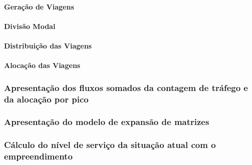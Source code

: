 \documentclass[]{article}
\let\oldparagraph\paragraph
\renewcommand{\paragraph}[1]{\oldparagraph{#1}\mbox{}}
\begin{document}
\hypertarget{gerauxe7uxe3o-de-viagens}{%
\paragraph{Geração de Viagens}\label{gerauxe7uxe3o-de-viagens}}

\hypertarget{divisuxe3o-modal}{%
\paragraph{Divisão Modal}\label{divisuxe3o-modal}}

\hypertarget{distribuiuxe7uxe3o-das-viagens}{%
\paragraph{Distribuição das
Viagens}\label{distribuiuxe7uxe3o-das-viagens}}

\hypertarget{alocauxe7uxe3o-das-viagens}{%
\paragraph{Alocação das Viagens}\label{alocauxe7uxe3o-das-viagens}}

\hypertarget{apresentauxe7uxe3o-dos-fluxos-somados-da-contagem-de-truxe1fego-e-da-alocauxe7uxe3o-por-pico}{%
\subsubsection{Apresentação dos fluxos somados da contagem de tráfego e
da alocação por
pico}\label{apresentauxe7uxe3o-dos-fluxos-somados-da-contagem-de-truxe1fego-e-da-alocauxe7uxe3o-por-pico}}

\hypertarget{apresentauxe7uxe3o-do-modelo-de-expansuxe3o-de-matrizes}{%
\subsubsection{Apresentação do modelo de expansão de
matrizes}\label{apresentauxe7uxe3o-do-modelo-de-expansuxe3o-de-matrizes}}

\hypertarget{cuxe1lculo-do-nuxedvel-de-serviuxe7o-da-situauxe7uxe3o-atual-com-o-empreendimento}{%
\subsubsection{Cálculo do nível de serviço da situação atual com o
empreendimento}\label{cuxe1lculo-do-nuxedvel-de-serviuxe7o-da-situauxe7uxe3o-atual-com-o-empreendimento}}
\end{document}
